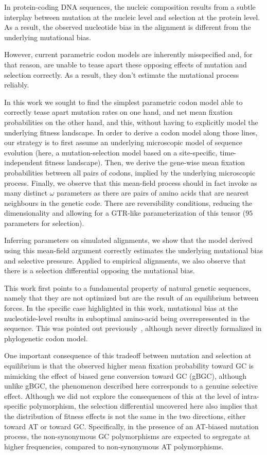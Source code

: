 \documentclass{article}
\begin{document}
In protein-coding {DNA} sequences, the nucleic composition results from a subtle interplay between mutation at the nucleic level and selection at the protein level.
As a result, the observed nucleotide bias in the alignment is different from the underlying mutational bias.

However, current parametric codon models are inherently misspecified and, for that reason, are unable to tease apart these opposing effects of mutation and selection correctly.
As a result, they don't estimate the mutational process reliably.

In this work we sought to find the simplest parametric codon model able to correctly tease apart mutation rates on one hand, and net mean fixation probabilities on the other hand, and this, without having to explicitly model the underlying fitness landscape.
In order to derive a codon model along those lines, our strategy is to first assume an underlying microscopic model of sequence evolution (here, a mutation-selection model based on a site-specific, time-independent fitness landscape).
Then, we derive the gene-wise mean fixation probabilities between all pairs of codons, implied by the underlying microscopic process.
Finally, we observe that this mean-field process should in fact invoke as many distinct $\omega$ parameters as there are pairs of amino acids that are nearest neighbours in the genetic code.
There are reversibility conditions, reducing the dimensionality and allowing for a GTR-like parameterization of this tensor ($95$ parameters for selection).

Inferring parameters on simulated alignments, we show that the model derived using this mean-field argument correctly estimates the underlying mutational bias and selective pressure.
Applied to empirical alignments, we also observe that there is a selection differential opposing the mutational bias.

This work first points to a fundamental property of natural genetic sequences, namely that they are not optimized but are the result of an equilibrium between forces.
In the specific case highlighted in this work, mutational bias at the nucleotide-level results in suboptimal amino-acid being overrepresented in the sequence.
This was pointed out previously~\citep{Singer2000}, although never directly formalized in phylogenetic codon model.

One important consequence of this tradeoff between mutation and selection at equilibrium is that the observed higher mean fixation probability toward GC is mimicking the effect of biased gene conversion toward GC ({gBGC}), although unlike {gBGC}, the phenomenon described here corresponds to a genuine selective effect.
Although we did not explore the consequences of this at the level of intra-specific polymorphism, the selection differential uncovered here also implies that the distribution of fitness effects is not the same in the two directions, either toward AT or toward GC.
Specifically, in the presence of an AT-biased mutation process, the {non-synonymous} GC polymorphisms are expected to segregate at higher frequencies, compared to {non-synonymous} AT polymorphisms.
\end{document}
